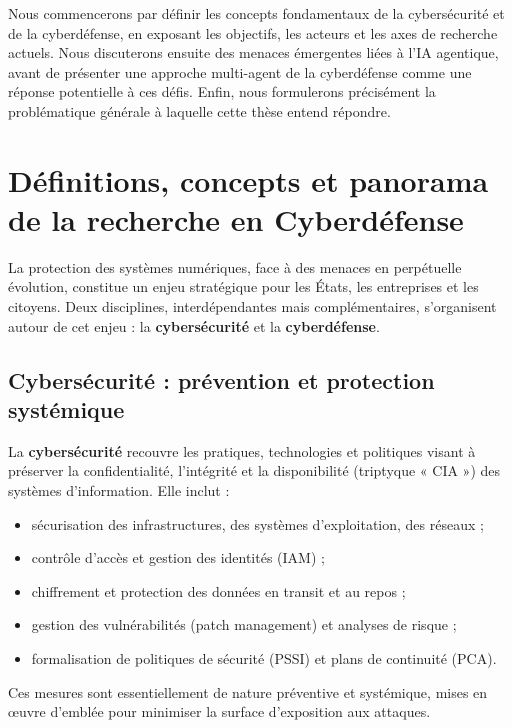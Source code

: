 \documentclass[ twoside,openright,titlepage,numbers=noenddot,headinclude,%
                footinclude=true,cleardoublepage=empty,abstractoff, %
                BCOR=5mm,paper=a4,fontsize=11pt,%
                french,american,%
                ]{scrreprt}
\begin{document}
Nous commencerons par définir les concepts fondamentaux de la cybersécurité et de la cyberdéfense, en exposant les objectifs, les acteurs et les axes de recherche actuels. Nous discuterons ensuite des menaces émergentes liées à l'IA agentique, avant de présenter une approche multi-agent de la cyberdéfense comme une réponse potentielle à ces défis. Enfin, nous formulerons précisément la problématique générale à laquelle cette thèse entend répondre.

\section{Définitions, concepts et panorama de la recherche en Cyberdéfense}\label{sec:cyberdef-panorama}


La protection des systèmes numériques, face à des menaces en perpétuelle évolution, constitue un enjeu stratégique pour les États, les entreprises et les citoyens. Deux disciplines, interdépendantes mais complémentaires, s'organisent autour de cet enjeu : la \textbf{cybersécurité} et la \textbf{cyberdéfense}.

\subsection*{Cybersécurité : prévention et protection systémique}

La \textbf{cybersécurité} recouvre les pratiques, technologies et politiques visant à préserver la confidentialité, l'intégrité et la disponibilité (triptyque « CIA ») des systèmes d'information. Elle inclut :
\begin{itemize}
  \item sécurisation des infrastructures, des systèmes d'exploitation, des réseaux ;
  \item contrôle d'accès et gestion des identités (IAM) ;
  \item chiffrement et protection des données en transit et au repos ;
  \item gestion des vulnérabilités (patch management) et analyses de risque ;
  \item formalisation de politiques de sécurité (PSSI) et plans de continuité (PCA).
\end{itemize}
Ces mesures sont essentiellement de nature préventive et systémique, mises en œuvre d'emblée pour minimiser la surface d'exposition aux attaques.
\end{document}
